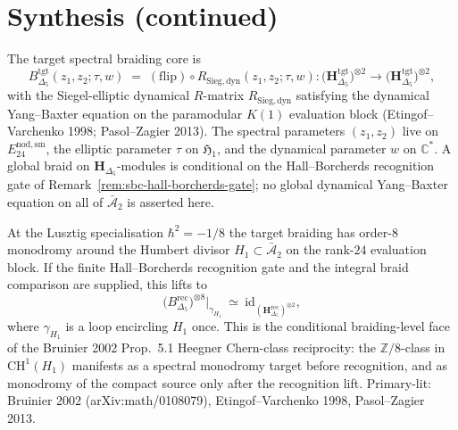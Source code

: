 \section{Synthesis (continued)}
\label{sec:sbc-deep}

\begin{remark}
\label{rem:sbc-deep-1}
The target spectral braiding core is
\[
B_{\Delta_5}^{\mathrm{tgt}}(z_1,z_2;\tau,w)
\;=\;
(\mathrm{flip})\circ R_{\mathrm{Sieg,dyn}}(z_1,z_2;\tau,w)
\colon
\bigl(\mathbf H_{\Delta_5}^{\mathrm{tgt}}\bigr)^{\otimes 2}
\to
\bigl(\mathbf H_{\Delta_5}^{\mathrm{tgt}}\bigr)^{\otimes 2},
\]
with the Siegel-elliptic dynamical $R$-matrix $R_{\mathrm{Sieg,dyn}}$
satisfying the dynamical Yang--Baxter equation on the paramodular
$K(1)$ evaluation block (Etingof--Varchenko 1998; Pasol--Zagier 2013).
The spectral parameters $(z_1,z_2)$ live on $E^{\mathrm{nod,sm}}_{24}$,
the elliptic parameter $\tau$ on $\mathfrak H_1$, and the dynamical
parameter $w$ on $\mathbb C^*$. A global braid on
$\mathbf H_{\Delta_5}$-modules is conditional on the Hall--Borcherds
recognition gate of Remark~\ref{rem:sbc-hall-borcherds-gate}; no
global dynamical Yang--Baxter equation on all of
$\bar{\mathcal A}_2$ is asserted here.
\end{remark}

\begin{remark}
\label{rem:sbc-deep-2}
At the Lusztig specialisation $\hbar^2 = -1/8$ the target braiding has
order-$8$ monodromy around the Humbert divisor
$H_1\subset\bar{\mathcal A}_2$ on the rank-$24$ evaluation block. If
the finite Hall--Borcherds recognition gate and the integral braid
comparison are supplied, this lifts to
\[
\bigl(B_{\Delta_5}^{\mathrm{rec}}\bigr)^{\otimes 8}
\big|_{\gamma_{H_1}}
\ \simeq\
\mathrm{id}_{(\mathbf H_{\Delta_5}^{\mathrm{rec}})^{\otimes 2}},
\]
where $\gamma_{H_1}$ is a loop encircling $H_1$ once. This is the
conditional braiding-level face of the Bruinier 2002 Prop.~5.1 Heegner
Chern-class reciprocity: the $\mathbb Z/8$-class in
$\mathrm{CH}^1(H_1)$ manifests as a spectral monodromy target before
recognition, and as monodromy of the compact source only after the
recognition lift. Primary-lit: Bruinier 2002 (arXiv:math/0108079),
Etingof--Varchenko 1998, Pasol--Zagier 2013.
\end{remark}
